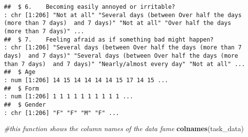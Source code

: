 \documentclass[
]{article}
\newenvironment{Shaded}{\begin{snugshade}}{\end{snugshade}}
\newcommand{\CommentTok}[1]{\textcolor[rgb]{0.56,0.35,0.01}{\textit{#1}}}
\newcommand{\FunctionTok}[1]{\textcolor[rgb]{0.13,0.29,0.53}{\textbf{#1}}}
\newcommand{\NormalTok}[1]{#1}
\begin{document}
\begin{verbatim}
##  $ 6.    Becoming easily annoyed or irritable?                                                                                                                                     : chr [1:206] "Not at all" "Several days (between Over half the days (more than 7 days)  and 7 days)" "Not at all" "Over half the days (more than 7 days)" ...
##  $ 7.    Feeling afraid as if something bad might happen?                                                                                                                          : chr [1:206] "Several days (between Over half the days (more than 7 days)  and 7 days)" "Several days (between Over half the days (more than 7 days)  and 7 days)" "Nearly/almost every day" "Not at all" ...
##  $ Age                                                                                                                                                                           : num [1:206] 14 15 14 14 14 14 15 17 14 15 ...
##  $ Form                                                                                                                                                                          : num [1:206] 1 1 1 1 1 1 1 1 1 1 ...
##  $ Gender                                                                                                                                                                        : chr [1:206] "F" "F" "M" "F" ...
\end{verbatim}

\begin{Shaded}
\begin{Highlighting}[]
\CommentTok{\#this function shows the column names of the data fame}
\FunctionTok{colnames}\NormalTok{(task\_data)}
\end{Highlighting}
\end{Shaded}
\end{document}
